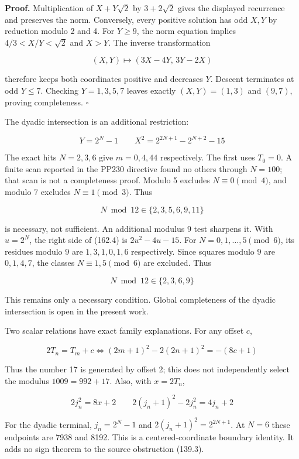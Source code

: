 \documentclass[
  11pt,
]{book}
\begin{document}
\textbf{Proof.} Multiplication of \(X+Y\sqrt2\) by \(3+2\sqrt2\) gives
the displayed recurrence and preserves the norm. Conversely, every
positive solution has odd \(X,Y\) by reduction modulo 2 and 4. For
\(Y\ge9\), the norm equation implies \(4/3<X/Y<\sqrt2\) and \(X>Y\). The
inverse transformation

\[
(X,Y)\mapsto(3X-4Y,\,3Y-2X)
\tag{162.3}
\]

therefore keeps both coordinates positive and decreases \(Y\). Descent
terminates at odd \(Y\le7\). Checking \(Y=1,3,5,7\) leaves exactly
\((X,Y)=(1,3)\) and \((9,7)\), proving completeness. \(\square\)

The dyadic intersection is an additional restriction:

\[
Y=2^N-1
\qquad X^2=2^{2N+1}-2^{N+2}-15
\tag{162.4}
\]

The exact hits \(N=2,3,6\) give \(m=0,4,44\) respectively. The first
uses \(T_0=0\). A finite scan reported in the PP230 directive found no
others through \(N=100\); that scan is not a completeness proof. Modulo
5 excludes \(N\equiv0\pmod4\), and modulo 7 excludes \(N\equiv1\pmod3\).
Thus

\[
N\bmod12\in\{2,3,5,6,9,11\}
\tag{162.5}
\]

is necessary, not sufficient. An additional modulus \(9\) test sharpens
it. With \(u=2^N\), the right side of (162.4) is \(2u^2-4u-15\). For
\(N=0,1,\ldots,5\pmod6\), its residues modulo \(9\) are \(1,3,1,0,1,6\)
respectively. Since squares modulo \(9\) are \(0,1,4,7\), the classes
\(N\equiv1,5\pmod6\) are excluded. Thus

\[
\boxed{N\bmod12\in\{2,3,6,9\}}
\tag{162.5a}
\]

This remains only a necessary condition. Global completeness of the
dyadic intersection is open in the present work.

Two scalar relations have exact family explanations. For any offset
\(c\),

\[
2T_n=T_m+c
\iff (2m+1)^2-2(2n+1)^2=-(8c+1)
\tag{162.6}
\]

Thus the number 17 is generated by offset 2; this does not independently
select the modulus \(1009=992+17\). Also, with \(x=2T_n\),

\[
2j_n^2=8x+2
\qquad 2(j_n+1)^2-2j_n^2=4j_n+2
\tag{162.7}
\]

For the dyadic terminal, \(j_n=2^N-1\) and \(2(j_n+1)^2=2^{2N+1}\). At
\(N=6\) these endpoints are 7938 and 8192. This is a centered-coordinate
boundary identity. It adds no sign theorem to the source obstruction
(139.3).
\end{document}
